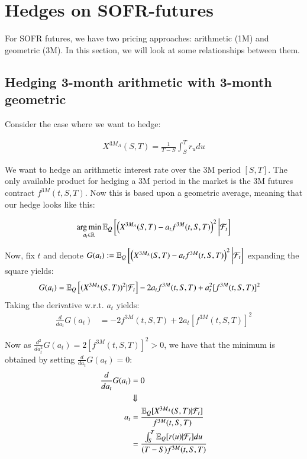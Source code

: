 \newpage 

\section{Hedges on SOFR-futures}
For SOFR futures, we have two pricing approaches: arithmetic (1M) and geometric (3M). In this section, we will look at some relationships between them.


\subsection{Hedging 3-month arithmetic with 3-month geometric}
Consider the case where we want to hedge:

\begin{align}
\label{eq: X_3MA(S,T)}
X^{3M_{A}}(S,T) = \frac{1}{T-S}\int_{S}^{T}r_{u}du    
\end{align}

We want to hedge an arithmetic interest rate over the 3M period $[S,T]$. The only available product for hedging a 3M period in the market is the 3M futures contract $f^{3M}(t,S,T)$. Now this is based upon a geometric average, meaning that our hedge looks like this:


\begin{align*}
\operatorname*{arg\,min}\limits_{a_{t} \in \mathbb{R}}\mathbb{E}_{Q}\left[
\left(
X^{3M_{A}}(S,T)-a_{t}f^{3M}(t,S,T)
\right)^{2}
\bigg{|}\mathcal{F}_{t}
\right]
\end{align*}

Now, fix $t$ and denote
 $G(a_{t}) :=\mathbb{E}_{Q}\left[
\left(X^{3M_{A}}(S,T)-a_{t}f^{3M}(t,S,T)
\right)^{2}
\bigg{|}\mathcal{F}_{t}
\right]
$ 
expanding the square yields:
\begin{align*}
G(a_{t}) &= \mathbb{E}_{Q}\left[(X^{3M_{A}}(S,T))^{2}|\mathcal{F}_{t}\right] -2a_{t}f^{3M}(t,S,T) +
a_{t}^{2}[f^{3M}(t,S,T)]^{2}
\end{align*}
Taking the derivative w.r.t. $a_{t}$ yields: 
\begin{align*}
\frac{d}{da_{t}}G(a_{t}) &= -2f^{3M}(t,S,T) + 2a_{t}[f^{3M}(t,S,T)]^{2}  
\end{align*} 

Now as $\frac{d^{2}}{da_{t}^{2}}G(a_{t}) = 2[f^{3M}(t,S,T)]^{2} > 0$, we have that the minimum is obtained by setting $\frac{d}{da_{t}}G(a_{t}) = 0$:
\begin{align*}
\frac{d}{da_{t}}G(a_{t}) &= 0 \\ 
&\Downarrow \\ 
a_{t} &= \frac{
\mathbb{E}_{Q}[X^{3M_{A}}(S,T)|\mathcal{F}_{t}]
}{
f^{3M}(t,S,T)
} \\ 
&= \frac{
\int_{S}^{T}\mathbb{E}_{Q}[r(u)|\mathcal{F}_{t}]du
}{
(T-S)f^{3M}(t,S,T)
}
\end{align*}


